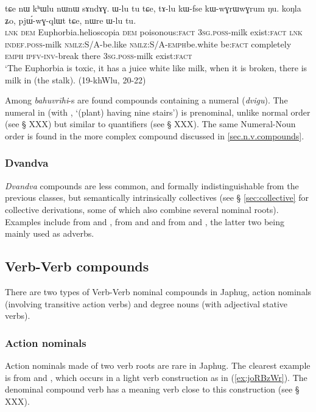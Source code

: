 \begin{exe}
\ex \label{ex:khWlu}  
\gll tɕe nɯ kʰɯlu nɯnɯ sɤndɤɣ. ɯ-lu tu tɕe, tɤ-lu kɯ-fse kɯ-wɣrɯ\redp{}wɣrum ŋu. koŋla ʑo, pjɯ́-wɣ-qlɯt tɕe, nɯre ɯ-lu tu. \\
\textsc{lnk} \textsc{dem} Euphorbia.helioscopia \textsc{dem} poisonous:\textsc{fact} \textsc{3sg.poss}-milk exist:\textsc{fact} \textsc{lnk}  \textsc{indef.poss}-milk \textsc{nmlz}:S/A-be.like \textsc{nmlz}:S/A-\textsc{emph}\redp{}be.white be:\textsc{fact} completely \textsc{emph} \textsc{ipfv}-\textsc{inv}-break there \textsc{3sg.poss}-milk exist:\textsc{fact} \\
\glt `The Euphorbia is toxic, it has a juice white like milk, when it is broken, there is milk in (the stalk). (19-khWlu, 20-22)
\end{exe}
Among \textit{bahuvrīhi}-s are found compounds containing a numeral (\textit{dvigu}). The numeral  in  (with , `(plant) having nine stairs') is prenominal, unlike normal order (see § XXX) but similar to quantifiers (see § XXX). The same Numeral-Noun order is found in the more complex compound  discussed in \ref{sec.n.v.compounds}.

\subsubsection{Dvandva} \label{sec:dvandva.n.n}
\textit{Dvandva} compounds are less common, and formally indistinguishable from the previous classes, but semantically intrinsically collectives (see § \ref{sec:collective} for collective derivations, some of which also combine several nominal roots). Examples include  from  and ,  from  and  and  from  and , the latter two being mainly used as adverbs.


\subsection{Verb-Verb compounds} \label{sec.v.v.compounds}
There are two types of Verb-Verb nominal compounds in Japhug, action nominals (involving transitive action verbs) and degree nouns (with adjectival stative verbs).

\subsubsection{Action nominals} \label{sec.v.v.compounds.action}
Action nominals made of two verb roots are rare in Japhug. The clearest example is  from    and , which occurs in a light verb construction as in (\ref{ex:joRBzWr}). The denominal compound verb   has a meaning verb close to this construction (see § XXX).

